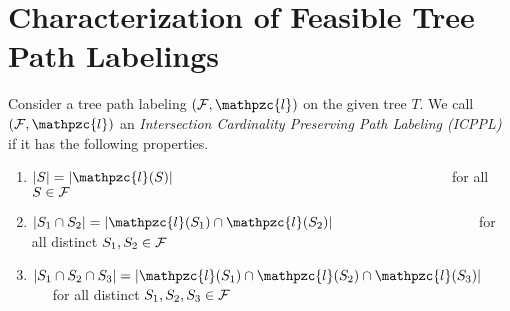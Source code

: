 \documentclass[envcountsect, envcountsame, 11pt]{../lib/llncs2e/llncs}
\def\cF{{\cal F}}
\def\cl{\mathpzc{l}}
\def\icpplpr{Property}
\def\topshrink{0mm} %
\begin{document}
\section{Characterization of Feasible Tree Path  Labelings} \label{sec:feasible} 
Consider a tree path labeling $(\cF, \cl)$ on the
given tree $T$.  We call $(\cF, \cl)$ an {\em Intersection Cardinality
  Preserving Path Labeling (ICPPL)} if it has the following
properties.


\begin{enumerate}[{(\icpplpr\ }i) \ \ \ ]
\item \label{pr:i} $|S| = |\cl(S)|$ \ \ \ \ \ \ \ \ \ \ \ \ \ \ \ \ \ \ \ \ \ \ \ \
  \ \ \ \ \ \ \ \ \ \ \ \ \ \ \ for all $S \in \cF$
\item \label{pr:ii}$|S_1 \cap S_2| = |\cl(S_1) \cap \cl(S_2)|$ \ \ \ \ \ \ \ \ \ \
  \ \ \ \ \ \ \ \ \ \ for all distinct
  $S_1, S_2 \in \cF$
\item \label{pr:iii}$|S_1 \cap S_2 \cap S_3| = |\cl(S_1) \cap \cl(S_2) \cap
  \cl(S_3)|$ \ \ \ for all distinct $S_1, S_2, S_3 \in
  \cF$
\end{enumerate}
\end{document}
